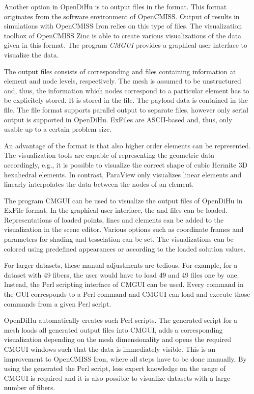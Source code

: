 Another option in OpenDiHu is to output files in the  format. This format originates from the software environment of OpenCMISS. Output of results in simulations with OpenCMISS Iron relies on this type of files. The visualization toolbox of OpenCMISS Zinc is able to create various visualizations of the data given in this format. The program \emph{CMGUI} provides a graphical user interface to visualize the data.

The output files consists of corresponding  and  files containing information at element and node levels, respectively. The mesh is assumed to be unstructured and, thus, the information which nodes correspond to a particular element has to be explicitely stored. It is stored in the  file. The payload data is contained in the  file. The file format supports parallel output to separate files, however only serial output is supported in OpenDiHu.
ExFiles are ASCII-based and, thus, only usable up to a certain problem size.

An advantage of the  format is that also higher order elements can be represented. The visualization tools are capable of representing the geometric data accordingly, e.g., it is possible to visualize the correct shape of cubic Hermite 3D hexahedral elements. In contrast, ParaView only visualizes linear elements and linearly interpolates the data between the nodes of an element.

The program CMGUI can be used to visualize the output files of OpenDiHu in ExFile format.
In the graphical user interface, the  and  files can be loaded. Representations of loaded points, lines and elements can be added to the visualization in the scene editor. Various options such as coordinate frames and parameters for shading and tesselation can be set. The visualizations can be colored using predefined appearances or according to the loaded solution values.

For larger datasets, these manual adjustments are tedious. For example, for a dataset with 49 fibers, the user would have to load 49  and 49  files one by one. Instead, the Perl scripting interface of CMGUI can be used. Every command in the GUI corresponds to a Perl command and CMGUI can load and execute those commands from a given Perl script.

OpenDiHu automatically creates such Perl scripts. The generated script for a mesh loads all generated output files into CMGUI, adds a  corresponding visualization depending on the mesh dimensionality and opens the required CMGUI windows such that the data is immediately visible. This is an improvement to OpenCMISS Iron, where all steps have to be done manually. By using the generated the Perl script, less expert knowledge on the usage of CMGUI is required and it is also possible to visualize datasets with a large number of fibers.

